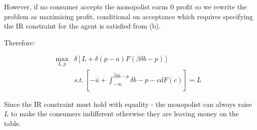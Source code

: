 \documentclass{article}
\begin{document}
However, if no consumer accepts the monopolist earns 0 profit so we rewrite the 
problem as maximising profit, conditional on acceptance which requires 
specifying the IR constraint for the agent is satisfied from (b).


Therefore:

\begin{align*}
    \max_{L,p} &\delta \left[
    L + \delta (p-a) F(\beta \delta b - p)
    \right]  \\
    & s.t. \ \left[ 
        -\overline{u} + \int^{\hat{\beta}\delta b - p}_{-\infty} \delta b - p - c dF(c)
        \right] = L
\end{align*}


Since the IR constraint must hold with equality - the monopolist can 
always raise $L$ to make the consumers indifferent otherwise they are 
leaving money on the table.
\end{document}
